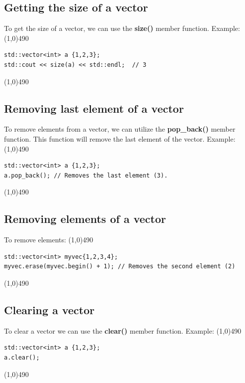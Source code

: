 \documentclass{report}
\begin{document}
    \bigbreak \noindent 
    \subsection{Getting the size of a vector}
    \bigbreak \noindent 
    To get the size of a vector, we can use the \textbf{size()} member function.
    \bigbreak \noindent 
    Example:
    \bigbreak \noindent 
    \line(1,0){490}
    \begin{verbatim}
std::vector<int> a {1,2,3};
std::cout << size(a) << std::endl;  // 3
    \end{verbatim}
    \line(1,0){490}

    \bigbreak \noindent 
    \subsection{Removing last element of a vector} 
    \bigbreak \noindent 
    To remove elements from a vector, we can utilize the \textbf{pop\_back()} member function. This function will remove the last element of the vector.
    \bigbreak \noindent 
    Example:
    \bigbreak \noindent 
    \line(1,0){490}
    \begin{verbatim}
std::vector<int> a {1,2,3};
a.pop_back(); // Removes the last element (3).
    \end{verbatim}
    \line(1,0){490}

    \bigbreak \noindent 
    \subsection{Removing elements of a vector }
    \bigbreak \noindent 
    To remove elements:
    \bigbreak \noindent 
    \line(1,0){490}
    \begin{verbatim}
std::vector<int> myvec{1,2,3,4};
myvec.erase(myvec.begin() + 1); // Removes the second element (2)
    \end{verbatim}
    \line(1,0){490}

    \bigbreak \noindent 
    \subsection{Clearing a vector}
    \bigbreak \noindent 
    To clear a vector we can use the \textbf{clear()} member function.
    \bigbreak \noindent 
    Example:
    \bigbreak \noindent 
    \line(1,0){490}
    \begin{verbatim}
std::vector<int> a {1,2,3};
a.clear();
    \end{verbatim}
    \line(1,0){490}
\end{document}
